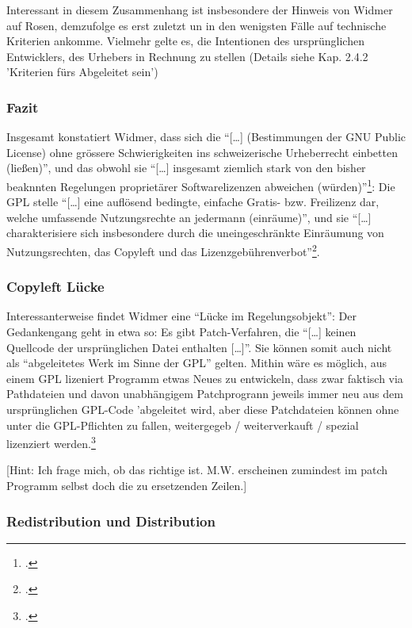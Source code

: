 \documentclass[DIV=calc,BCOR=5mm,11pt,headings=small,oneside,abstract=true, toc=bib]{scrartcl}
\begin{document}
Interessant in diesem Zusammenhang ist insbesondere der Hinweis von Widmer auf
Rosen, demzufolge es erst zuletzt un in den wenigsten Fälle auf technische
Kriterien ankomme. Vielmehr gelte es, die Intentionen des ursprünglichen
Entwicklers, des Urhebers in Rechnung zu stellen (Details siehe Kap. 2.4.2
'Kriterien fürs Abgeleitet sein')

\subsubsection{Fazit}

Insgesamt konstatiert Widmer, dass sich die \enquote{[\ldots] (Bestimmungen der
GNU Public License) ohne grössere Schwierigkeiten ins schweizerische
Urheberrecht einbetten (ließen)}, und das obwohl sie \enquote{[\ldots]
insgesamt ziemlich stark von den bisher beaknnten Regelungen proprietärer
Softwarelizenzen abweichen (würden)}\footcite[vgl.][182]{Widmer2003a}: Die
GPL stelle \enquote{[\ldots] eine auflösend bedingte, einfache Gratis- bzw.
Freilizenz dar, welche umfassende Nutzungsrechte an jedermann (einräume)},
und sie \enquote{[\ldots] charakterisiere sich insbesondere durch die
uneingeschränkte Einräumung von Nutzungsrechten, das Copyleft und das
Lizenzgebührenverbot}\footcite[vgl.][182]{Widmer2003a}.

\subsubsection{Copyleft Lücke}
Interessanterweise findet Widmer eine \enquote{Lücke im Regelungsobjekt}:
Der Gedankengang geht in etwa so: Es gibt Patch-Verfahren, die \enquote{[\ldots]
keinen Quellcode der ursprünglichen Datei enthalten [\ldots]}. Sie können
somit auch nicht als \enquote{abgeleitetes Werk im Sinne der GPL} gelten.
Mithin wäre es möglich, aus einem GPL lizeniert Programm etwas Neues zu
entwickeln, dass zwar faktisch via Pathdateien und davon unabhängigem
Patchprogrann jeweils immer neu aus dem ursprünglichen GPL-Code 'abgeleitet
wird, aber diese Patchdateien können ohne unter die GPL-Pflichten zu fallen,
weitergegeb / weiterverkauft / spezial lizenziert
werden.\footcite[vgl.][144f]{Widmer2003a}

[Hint: Ich frage mich, ob das richtige ist. M.W. erscheinen zumindest im patch
Programm selbst doch die zu ersetzenden Zeilen.]


\subsubsection{Redistribution und Distribution}
\end{document}
